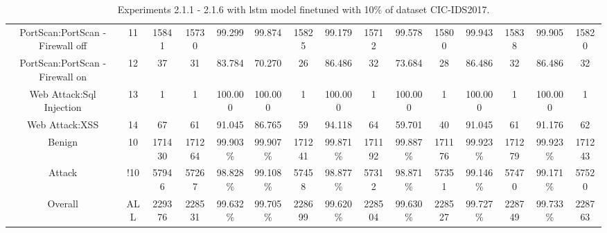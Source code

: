 \begin{table}[htb]
\begin{tabular}{@{}ccccccccccccccc@{}}
        PortScan:PortScan - Firewall off &  11 &  15841 &  15730 &  99.299 &  99.874 &  15825 &  99.179 &  15712 &  99.578 &  15800 &  99.943 &  15838 &  99.905 &  15820 \\
        PortScan:PortScan - Firewall on &  12 &  37 &  31 &  83.784 &  70.270 &  26 &  86.486 &  32 &  73.684 &  28 &  86.486 &  32 &  86.486 &  32 \\
        Web Attack:Sql Injection &  13 &  1 &  1 &  100.000 &  100.000 &  1 &  100.000 &  1 &  100.000 &  1 &  100.000 &  1 &  100.000 &  1 \\
        Web Attack:XSS &  14 &  67 &  61 &  91.045 &  86.765 &  59 &  94.118 &  64 &  59.701 &  40 &  91.045 &  61 &  91.176 &  62 \\
        Benign &  10 &  171430 &  171264 &  99.903\% &  99.907\% &  171241 &  99.871\% &  171192 &  99.887\% &  171176 &  99.923\% &  171279 &  99.923\% &  171243 \\
        Attack &  !10 &  57946 &  57267 &  98.828\% &  99.108\% &  57458 &  98.877\% &  57312 &  98.871\% &  57351 &  99.146\% &  57470 &  99.171\% &  57520 \\
        Overall &  ALL &  229376 &  228531 &  99.632\% &  99.705\% &  228699 &  99.620\% &  228504 &  99.630\% &  228527 &  99.727\% &  228749 &  99.733\% &  228763 \\
        \bottomrule
    \end{tabular}
    \caption{Experiments 2.1.1 - 2.1.6 with \gls{lstm} model finetuned with 10\% of dataset CIC-IDS2017.}
    \label{table:results:lstm:flows_10}
\end{table}